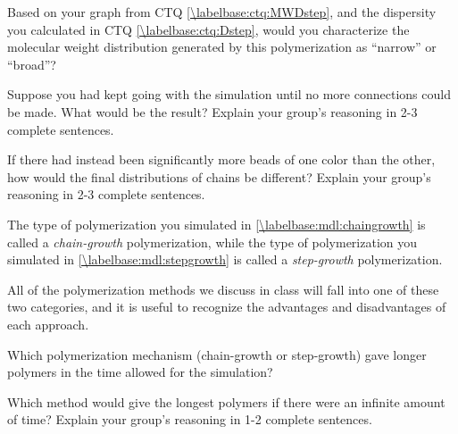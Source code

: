 \begin{activity}
\begin{ctqs}
	\question Based on your graph from CTQ \ref{\labelbase:ctq:MWDstep}, and the dispersity you calculated in CTQ \ref{\labelbase:ctq:Dstep}, would you characterize the molecular weight distribution generated by this polymerization as ``narrow'' or ``broad''?  %
	
		\begin{solution}[1in]
		\end{solution}
	
	\question Suppose you had kept going with the simulation until no more  connections could be made.  What would be the result?  Explain your group's reasoning in 2-3 complete sentences.
	
		\begin{solution}[2in]
		\end{solution}
	
	\question If there had instead been significantly more beads of one color than the other, how would the final distributions of chains be different?  Explain your group's reasoning in 2-3 complete sentences.
	
		\begin{solution}[2in]
		\end{solution}
	
\end{ctqs}

\begin{infobox}
	The type of polymerization you simulated in \ref{\labelbase:mdl:chaingrowth} is called a \emph{chain-growth} polymerization, while the type of polymerization you simulated in  \ref{\labelbase:mdl:stepgrowth} is called a \emph{step-growth} polymerization.
	
	All of the polymerization methods we discuss in class will fall into one of these two categories, and it is useful to recognize the advantages and disadvantages of each approach.
\end{infobox}

\begin{ctqs}
	\question Which polymerization mechanism (chain-growth or step-growth) gave longer polymers in the time allowed for the simulation?
	
		\begin{solution}[0.75in]
		\end{solution}
	
	\question Which method would give the longest polymers if there were an infinite amount of time?  Explain your group's reasoning in 1-2 complete sentences.
	

\end{ctqs}
\end{activity}
